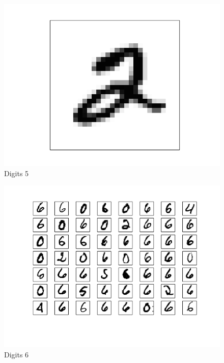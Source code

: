 \documentclass[10pt]{article}
\begin{document}
\begin{figure}
\begin{center}
\includegraphics[scale=0.5]{meansA5}
\caption{Digits 5}
\end{center}
\end{figure}
\begin{figure}
\begin{center}
\includegraphics[scale=0.5]{meansA6}
\caption{Digits 6}
\end{center}
\end{figure}
\end{document}
